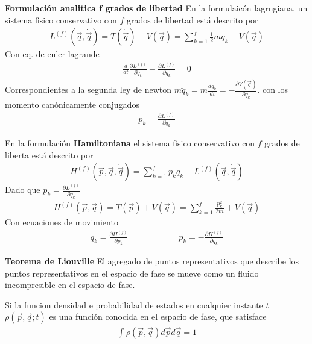 \documentclass{article}
\begin{document}
\textbf{Formulación analitica f grados de libertad } En la formulaicón lagrngiana, un sistema fisico conservativo con $ f  $ grados de libertad está descrito por 
\begin{gather*}
  L ^ {(f)} (\vec q, \dot {\vec q} ) = T(\dot {\vec q}) - V (\vec q) = \displaystyle\sum_{k = 1 }^{ f } \frac{1}{2}m \dot q_k - V(\vec q ) 
\end{gather*}
Con eq. de euler-lagrande 
\begin{gather*}
  \frac{d  }{d t } \frac{\partial L ^ {(f) } }{\partial \dot q_k } - \frac{\partial L ^ {(f) } }{\partial q_k } = 0  
\end{gather*}
Correspondientes a la segunda ley de newton $ m \ddot q_k = m \frac{d \dot q _k  }{d t } = - \frac{\partial V(\vec q ) }{\partial q_k }$. con los momento canónicamente conjugados 
\begin{gather*}
  p_k = \frac{\partial L ^ {(f) } }{\partial \dot q_k} 
\end{gather*}

En la formulación \textbf{Hamiltoniana } el sistema fisico conservativo con $ f  $ grados de liberta está descrito por 
\begin{gather*}
  H ^ {(f) }(\vec p , \vec q, \dot{\vec q }) = \displaystyle\sum_{k = 1 }^{f }p_k \dot q_k - L ^{(f) } (\vec q, \dot{\vec q })
\end{gather*}
Dado que $ p_k = \frac{\partial L ^ {(f) } }{\partial \dot q _k } $
\begin{gather*}
  H ^ {(f) }(\vec p , \vec q ) = T(\vec p ) + V(\vec q) = \displaystyle\sum_{k=1 }^{f } \frac{p_k ^2 }{2m } + V(\vec q ) 
\end{gather*}
Con ecuaciones de movimiento 
\begin{gather*}
  \dot q_k = \frac{\partial H ^ {(f) } }{\partial p_k }\qquad \qquad \qquad \dot p _k = - \frac{\partial H ^ {(f) } }{\partial q_k } 
\end{gather*}

\hfill 

\hfill 

\textbf{Teorema de Liouville } El agregado de puntos representativos que describe los puntos representativos en el espacio de fase se mueve como un fluido incompresible en el espacio de fase. 

\hfill 

\hfill 

Si la funcion densidad e probabilidad de estados en cualquier instante $ t  $ $ \rho(\vec p , \vec q ; t ) $ es una función conocida en el espacio de fase, que satisface 
\begin{gather*}
  \int_{}^{} \rho(\vec p, \vec q ) d\vec p d \vec q = 1  
\end{gather*}
\end{document}
